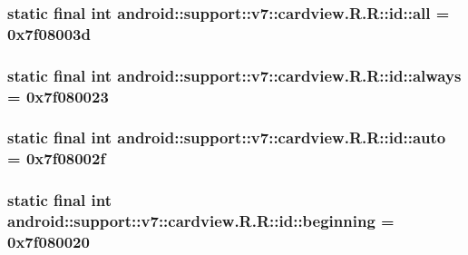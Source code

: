 \hypertarget{classandroid_1_1support_1_1v7_1_1cardview_1_1_r_1_1id_f944289f6e27ca2ff6a6210b61ca1c58}{
\subsubsection[{all}]{\setlength{\rightskip}{0pt plus 5cm}static final int android::support::v7::cardview.R.R::id::all = 0x7f08003d}}
\label{classandroid_1_1support_1_1v7_1_1cardview_1_1_r_1_1id_f944289f6e27ca2ff6a6210b61ca1c58}


\hypertarget{classandroid_1_1support_1_1v7_1_1cardview_1_1_r_1_1id_c42cc0a18cb65c5e1e7a1d6279c1facd}{
\subsubsection[{always}]{\setlength{\rightskip}{0pt plus 5cm}static final int android::support::v7::cardview.R.R::id::always = 0x7f080023}}
\label{classandroid_1_1support_1_1v7_1_1cardview_1_1_r_1_1id_c42cc0a18cb65c5e1e7a1d6279c1facd}


\hypertarget{classandroid_1_1support_1_1v7_1_1cardview_1_1_r_1_1id_e3d8272b4747dd3348f66d490dbcd763}{
\subsubsection[{auto}]{\setlength{\rightskip}{0pt plus 5cm}static final int android::support::v7::cardview.R.R::id::auto = 0x7f08002f}}
\label{classandroid_1_1support_1_1v7_1_1cardview_1_1_r_1_1id_e3d8272b4747dd3348f66d490dbcd763}


\hypertarget{classandroid_1_1support_1_1v7_1_1cardview_1_1_r_1_1id_34378b7afa2b908030c77d88ad647ef9}{
\subsubsection[{beginning}]{\setlength{\rightskip}{0pt plus 5cm}static final int android::support::v7::cardview.R.R::id::beginning = 0x7f080020}}
\label{classandroid_1_1support_1_1v7_1_1cardview_1_1_r_1_1id_34378b7afa2b908030c77d88ad647ef9}


